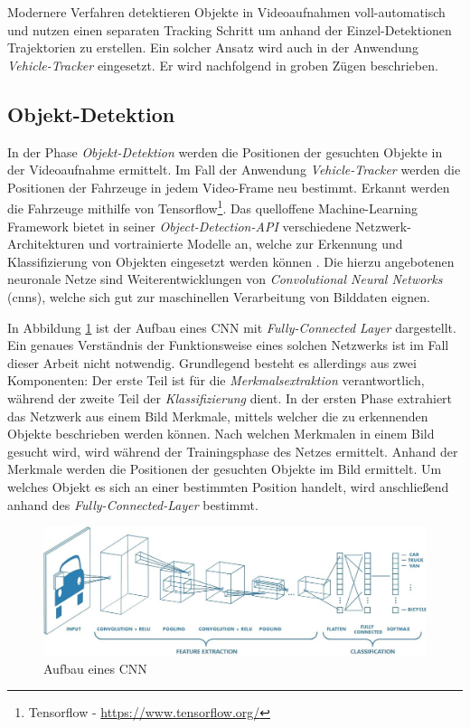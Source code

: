 Modernere Verfahren detektieren Objekte in Videoaufnahmen voll-automatisch und nutzen einen separaten Tracking
Schritt um anhand der Einzel-Detektionen Trajektorien zu erstellen. Ein solcher Ansatz wird auch in der Anwendung
\textit{Vehicle-Tracker} eingesetzt. Er wird nachfolgend in groben Zügen beschrieben.

\subsection{Objekt-Detektion}

In der Phase \textit{Objekt-Detektion} werden die Positionen der gesuchten Objekte in der Videoaufnahme ermittelt.
Im Fall der Anwendung \textit{Vehicle-Tracker} werden die Positionen der Fahrzeuge in jedem Video-Frame neu bestimmt.
Erkannt werden die Fahrzeuge mithilfe von Tensorflow\footnote{Tensorflow - \url{https://www.tensorflow.org/}}.
Das quelloffene Machine-Learning Framework bietet in seiner \textit{Object-Detection-API}
verschiedene Netzwerk-Architekturen und vortrainierte Modelle an, welche zur Erkennung und Klassifizierung
von Objekten eingesetzt werden können \cite[]{Huang2018}. Die hierzu angebotenen neuronale Netze sind Weiterentwicklungen
von \textit{Convolutional Neural Networks} (\acrshort*{cnn}s), welche sich gut zur maschinellen Verarbeitung
von Bilddaten eignen.

In Abbildung \ref{fig:grund_structure_cnn} ist der Aufbau eines CNN mit \textit{Fully-Connected Layer} dargestellt.
Ein genaues Verständnis der Funktionsweise eines solchen Netzwerks ist im Fall dieser Arbeit nicht notwendig.
Grundlegend besteht es allerdings aus zwei Komponenten: Der erste Teil ist für
die \textit{Merkmalsextraktion} verantwortlich, während der zweite Teil der \textit{Klassifizierung} dient.
In der ersten Phase extrahiert das Netzwerk aus einem Bild Merkmale, mittels
welcher die zu erkennenden Objekte beschrieben werden können. Nach welchen Merkmalen in einem Bild gesucht wird,
wird während der Trainingsphase des Netzes ermittelt.
Anhand der Merkmale werden die Positionen der gesuchten Objekte im Bild ermittelt.
Um welches Objekt es sich an einer bestimmten Position handelt, wird anschließend anhand
des \textit{Fully-Connected-Layer} bestimmt. \cite[]{Cornelisse2018}

\begin{figure}[H]
    \centering
    \includegraphics[width=0.95\linewidth]{resources/img/grundlagen/TrajectoryReconstruction/cnn_structure}
    \caption[Aufbau eines CNN]{Aufbau eines CNN \cite[]{PatelShyamal2017}}
    \label{fig:grund_structure_cnn}
\end{figure}

